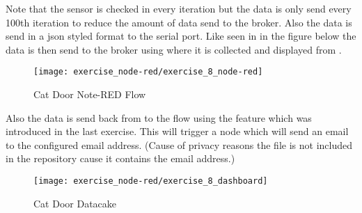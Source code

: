 Note that the sensor is checked in every iteration but the data is only send every 100th iteration to reduce 
the amount of data send to the broker. Also the data is send in a json styled format to the serial port.
\newline
\newline
Like seen in in the figure below the data is then send to the broker using  where it is 
collected and displayed from .

\begin{figure}[H]
  \centering
  \texttt{[image: exercise\_node-red/exercise\_8\_node-red]}
  \caption{Cat Door Note-RED Flow}
  \label{fig:cat_door}
\end{figure}

Also the data is send back from  to the  flow using the  feature 
which was introduced in the last exercise. This will trigger a  node which will send an email to 
the configured email address. (Cause of privacy reasons the  file is not included in the repository 
cause it contains the email address.)

\begin{figure}[H]
  \centering
  \texttt{[image: exercise\_node-red/exercise\_8\_dashboard]}
  \caption{Cat Door Datacake}
  \label{fig:cat_door_datacake}
\end{figure}